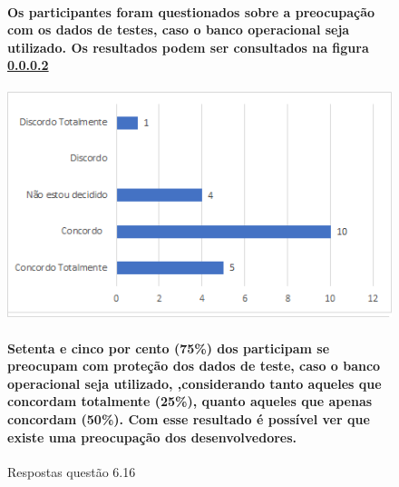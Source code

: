 \begin{figure}[!t]
\centering
\paragraph{Os participantes foram questionados sobre a preocupação com os dados de testes, caso o banco operacional seja utilizado. Os resultados podem ser consultados na figura \ref{fig:6.16}}
\includegraphics[scale=0.7]{figuras das questoes/6.16.png}
\caption{Respostas questão 6.16}
\paragraph{Setenta e cinco por cento (75{\%}) dos participam se preocupam com proteção dos dados de teste, caso o banco operacional seja utilizado, ,considerando tanto aqueles que concordam totalmente (25{\%}), quanto aqueles que apenas concordam (50{\%}).  Com esse resultado é possível ver que existe uma preocupação dos desenvolvedores.}
\label{fig:6.16}
\end{figure}
